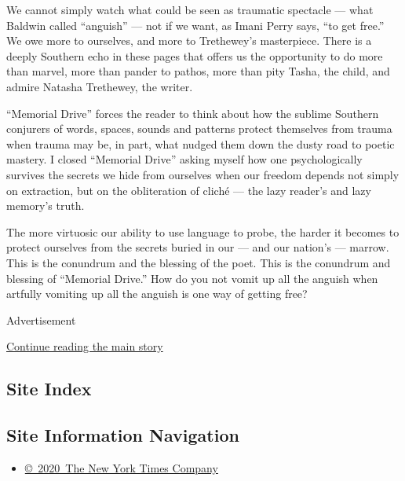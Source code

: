 We cannot simply watch what could be seen as traumatic spectacle ---
what Baldwin called ``anguish'' --- not if we want, as Imani Perry says,
``to get free.'' We owe more to ourselves, and more to Trethewey's
masterpiece. There is a deeply Southern echo in these pages that offers
us the opportunity to do more than marvel, more than pander to pathos,
more than pity Tasha, the child, and admire Natasha Trethewey, the
writer.

``Memorial Drive'' forces the reader to think about how the sublime
Southern conjurers of words, spaces, sounds and patterns protect
themselves from trauma when trauma may be, in part, what nudged them
down the dusty road to poetic mastery. I closed ``Memorial Drive''
asking myself how one psychologically survives the secrets we hide from
ourselves when our freedom depends not simply on extraction, but on the
obliteration of cliché --- the lazy reader's and lazy memory's truth.

The more virtuosic our ability to use language to probe, the harder it
becomes to protect ourselves from the secrets buried in our --- and our
nation's --- marrow. This is the conundrum and the blessing of the poet.
This is the conundrum and blessing of ``Memorial Drive.'' How do you not
vomit up all the anguish when artfully vomiting up all the anguish is
one way of getting free?

Advertisement

\protect\hyperlink{after-bottom}{Continue reading the main story}

\hypertarget{site-index}{%
\subsection{Site Index}\label{site-index}}

\hypertarget{site-information-navigation}{%
\subsection{Site Information
Navigation}\label{site-information-navigation}}

\begin{itemize}
\tightlist
\item
  \href{https://help.nytimes.com/hc/en-us/articles/115014792127-Copyright-notice}{©~2020~The
  New York Times Company}
\end{itemize}

